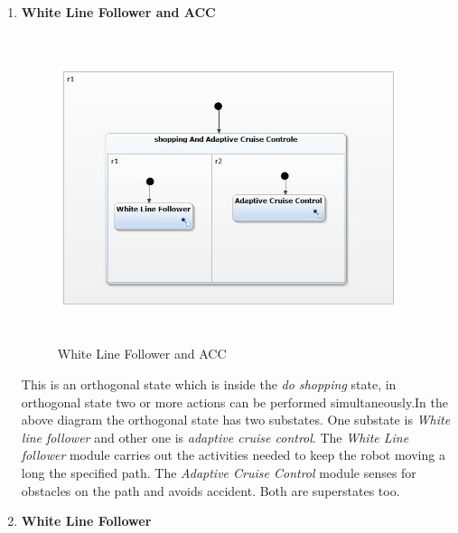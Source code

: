 \documentclass[a4paper,12pt,oneside]{article}
\begin{document}
\begin{enumerate}
\item \textbf{White Line Follower and ACC} 
\begin{figure}[H]
\centering
\includegraphics[width=10cm,height=9cm]{1.jpg}
\caption{White Line Follower and ACC}
\end{figure}
This is an orthogonal state which is inside the \emph{do shopping} state, in  orthogonal state two or more actions can be performed simultaneously.In the above diagram the orthogonal state has two substates. One substate is \emph{White line follower} and other one is \emph{adaptive cruise control}. The \emph{White Line follower} module carries out the activities needed to keep the robot moving a long the specified path. The \emph{Adaptive Cruise Control} module senses for obstacles on the path and avoids accident. Both are superstates too.\\
\item \textbf{White Line Follower}\\


\end{enumerate}
\end{document}
